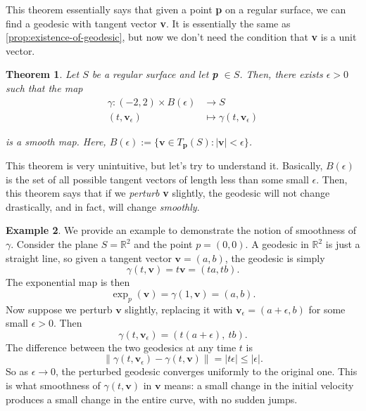 \documentclass[10pt, a4paper]{article}
\theoremstyle{plain}
\newtheorem{theorem}{Theorem}[section]
\theoremstyle{definition}
\newtheorem{example}[theorem]{Example}
\theoremstyle{remark}
\newenvironment{sidenote}{%
  \par\vspace{0.5em}%
  \noindent\color{defcolor}%
}{%
  \par\vspace{0.5em}%
  \color{black}%
}
\begin{document}
\begin{sidenote}
    This theorem essentially says that given a point \textbf{p} on a regular surface, we can find a geodesic with tangent vector \textbf{v}. It is essentially the same as \ref{prop:existence-of-geodesic}, but now we don't need the condition that \textbf{v} is a unit vector.
\end{sidenote}


\begin{theorem}
    Let $S$ be a regular surface and let \textbf{p} $\in S$. Then, there exists $\epsilon>0$ such that the map
    \begin{align*}
        \gamma: (-2,2) \times B(\epsilon) &\to S \\
        (t, \textbf{v}_\epsilon) &\mapsto \gamma(t,\textbf{v}_\epsilon)
    \end{align*} 

    is a smooth map. Here, $B(\epsilon) := \{ \textbf{v} \in T_\textbf{p}(S): |\textbf{v}| < \epsilon \}$.
\end{theorem}

\begin{sidenote}
    This theorem is very unintuitive, but let's try to understand it. Basically, $B(\epsilon)$ is the set of all possible tangent vectors of length less than some small $\epsilon$. Then, this theorem says that if we \textit{perturb} \textbf{v} slightly, the geodesic will not change drastically, and in fact, will change \textit{smoothly}.
\end{sidenote}


\begin{example}
    We provide an example to demonstrate the notion of smoothness of $\gamma$. Consider the plane $S = \mathbb{R}^2$ and the point $p = (0,0)$. A geodesic in $\mathbb{R}^2$ is just a straight line, so given a tangent vector 
    $\mathbf{v} = (a, b)$, the geodesic is simply
    \[
        \gamma(t, \mathbf{v}) = t\mathbf{v} = (ta, tb).
    \]
    The exponential map is then
    \[
        \exp_p(\mathbf{v}) = \gamma(1, \mathbf{v}) = (a, b).
    \]
    Now suppose we perturb $\mathbf{v}$ slightly, replacing it with 
    $\mathbf{v}_\epsilon = (a + \epsilon, b)$ for some small $\epsilon > 0$. Then
    \[
        \gamma(t, \mathbf{v}_\epsilon) = (t(a+\epsilon),\ tb).
    \]
    The difference between the two geodesics at any time $t$ is
    \[
        \|\gamma(t, \mathbf{v}_\epsilon) - \gamma(t, \mathbf{v})\| = |t\epsilon| \leq |\epsilon|.
    \]
    So as $\epsilon \to 0$, the perturbed geodesic converges uniformly to the original 
    one. This is what smoothness of $\gamma(t, \mathbf{v})$ in $\mathbf{v}$ means: 
    a small change in the initial velocity produces a small change in the entire curve,
    with no sudden jumps.
\end{example}
\end{document}
